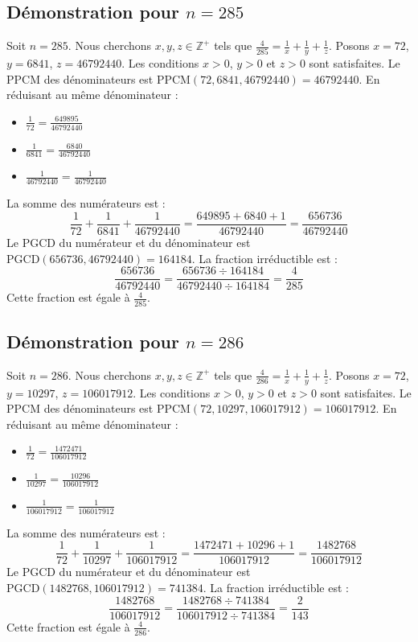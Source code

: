 \documentclass[11pt,a4paper]{article}
\begin{document}
\subsection{Démonstration pour $n = 285$}
Soit $n = 285$. Nous cherchons $x, y, z \in \mathbb{Z}^{+}$ tels que $\frac{4}{285} = \frac{1}{x} + \frac{1}{y} + \frac{1}{z}$.
Posons $x = 72$, $y = 6841$, $z = 46792440$.
Les conditions $x > 0$, $y > 0$ et $z > 0$ sont satisfaites.
Le PPCM des dénominateurs est $\text{PPCM}(72, 6841, 46792440) = 46792440$.
En réduisant au même dénominateur :
\begin{itemize}
    \item $\frac{1}{72} = \frac{649895}{46792440}$
    \item $\frac{1}{6841} = \frac{6840}{46792440}$
    \item $\frac{1}{46792440} = \frac{1}{46792440}$
\end{itemize}
La somme des numérateurs est :
$$ \frac{1}{72} + \frac{1}{6841} + \frac{1}{46792440} = \frac{649895 + 6840 + 1}{46792440} = \frac{656736}{46792440} $$
Le PGCD du numérateur et du dénominateur est $\text{PGCD}(656736, 46792440) = 164184$.
La fraction irréductible est :
$$ \frac{656736}{46792440} = \frac{656736 \div 164184}{46792440 \div 164184} = \frac{4}{285} $$
Cette fraction est égale à $\frac{4}{285}$.

\subsection{Démonstration pour $n = 286$}
Soit $n = 286$. Nous cherchons $x, y, z \in \mathbb{Z}^{+}$ tels que $\frac{4}{286} = \frac{1}{x} + \frac{1}{y} + \frac{1}{z}$.
Posons $x = 72$, $y = 10297$, $z = 106017912$.
Les conditions $x > 0$, $y > 0$ et $z > 0$ sont satisfaites.
Le PPCM des dénominateurs est $\text{PPCM}(72, 10297, 106017912) = 106017912$.
En réduisant au même dénominateur :
\begin{itemize}
    \item $\frac{1}{72} = \frac{1472471}{106017912}$
    \item $\frac{1}{10297} = \frac{10296}{106017912}$
    \item $\frac{1}{106017912} = \frac{1}{106017912}$
\end{itemize}
La somme des numérateurs est :
$$ \frac{1}{72} + \frac{1}{10297} + \frac{1}{106017912} = \frac{1472471 + 10296 + 1}{106017912} = \frac{1482768}{106017912} $$
Le PGCD du numérateur et du dénominateur est $\text{PGCD}(1482768, 106017912) = 741384$.
La fraction irréductible est :
$$ \frac{1482768}{106017912} = \frac{1482768 \div 741384}{106017912 \div 741384} = \frac{2}{143} $$
Cette fraction est égale à $\frac{4}{286}$.
\end{document}
